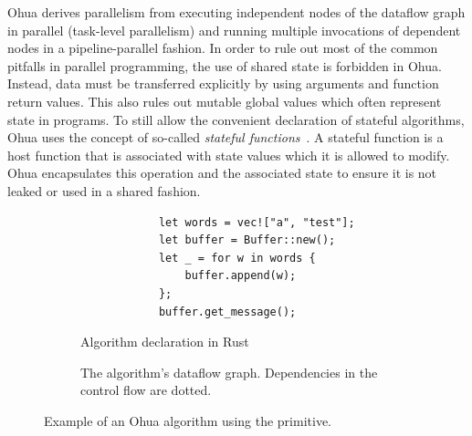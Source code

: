 Ohua derives parallelism from executing independent nodes of the dataflow graph in parallel (task-level parallelism) and running multiple invocations of dependent nodes in a pipeline-parallel fashion.
In order to rule out most of the common pitfalls in parallel programming, the use of shared state is forbidden in Ohua.
Instead, data must be transferred explicitly by using arguments and function return values.
This also rules out mutable global values which often represent state in programs.
To still allow the convenient declaration of stateful algorithms, Ohua uses the concept of so-called \emph{stateful functions}~\cite{ertel2019stclang}.
A stateful function is a host function that is associated with state values which it is allowed to modify.
Ohua encapsulates this operation and the associated state to ensure it is not leaked or used in a shared fashion.

\begin{figure}[h]
    \begin{subfigure}[h]{.5\textwidth}
        \begin{verbatim}
            let words = vec!["a", "test"];
            let buffer = Buffer::new();
            let _ = for w in words {
                buffer.append(w);
            };
            buffer.get_message();
        \end{verbatim}
        \caption{Algorithm declaration in Rust}
        \label{fig:backend:smap:algo}
    \end{subfigure}
    \begin{subfigure}[h]{.5\textwidth}
        \caption{The algorithm's dataflow graph. Dependencies in the control flow are dotted.}
        \label{fig:backend:smap:dfg}
    \end{subfigure}
    \caption{Example of an Ohua algorithm using the  primitive.}%
    \label{fig:background:smap}
\end{figure}

